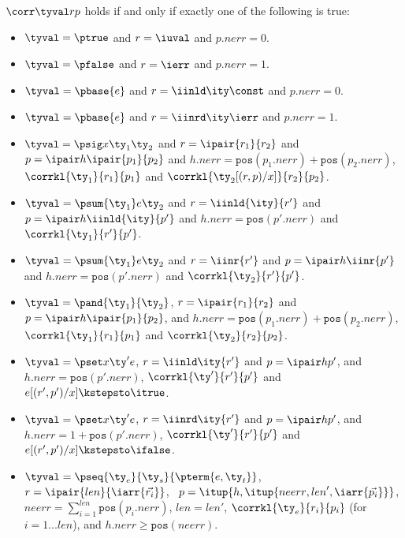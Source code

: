 \begin{definition}
$\corr \tyval r p$ holds if and only if exactly one of the following is true:
  \begin{itemize}
  \item $\tyval = \ptrue$ and $r = \iuval$ and $p.{nerr} = 0$.
  \item $\tyval = \pfalse$ and $r = \ierr$ and $p.{nerr} = 1$.
  \item $\tyval = \pbase{e}$ and $r = \iinld \ity \const$ and $p.{nerr} = 0$.
  \item $\tyval = \pbase{e}$ and $r = \iinrd \ity \ierr$ and $p.{nerr} = 1$.
  \item $\tyval = \psig x {\ty_1} {\ty_2}$ and $r =\ipair {r_1} {r_2}$ and $p =
    \ipair h {\ipair {p_1} {p_2}}$ 
    and $h.{nerr} = \mathtt{pos}(p_1.{nerr}) + \mathtt{pos}(p_2.{nerr})$, $\corrkl
    {\ty_1} {r_1} {p_1}$ and $\corrkl {\ty_2[(r,p)/x]} {r_2} {p_2}$.
  \item $\tyval = \psum {\ty_1} e {\ty_2}$ and $r =\iinld {\ity}{r'}$
    and $p = \ipair h {\iinld {\ity}{p'}}$
    and $h.{nerr} = \mathtt{pos}(p'.{nerr})$ and $\corrkl
    {\ty_1} {r'} {p'}$.
  \item $\tyval = \psum {\ty_1} e {\ty_2}$ and $r =\iinr {r'}$
    and $p = \ipair h {\iinr {p'}}$
    and $h.{nerr} = \mathtt{pos}(p'.{nerr})$ and $\corrkl
    {\ty_2} {r'} {p'}$.
  \item $\tyval = \pand {\ty_1} {\ty_2}$, $r = \ipair {r_1} {r_2}$ and $p =
    \ipair h {\ipair {p_1}{p_2}}$, 
    and $h.{nerr} = \mathtt{pos}(p_1.{nerr}) + \mathtt{pos}(p_2.{nerr})$, 
    $\corrkl {\ty_1} {r_1} {p_1}$ and $\corrkl {\ty_2} {r_2} {p_2}$.
  \item $\tyval = \pset x {\ty'} e$, $r = \iinld \ity {r'}$ and $p =
    \ipair h {p'}$, 
    and $h.{nerr} = \mathtt{pos}(p'.{nerr})$, $\corrkl {\ty'}{r'}{p'}$
    and $e[(r',p')/x] \kstepsto\itrue$.
  \item $\tyval = \pset x {\ty'} e$, $r = \iinrd \ity {r'}$
    and $p = \ipair h {p'}$,
    and $h.{nerr} = 1 + \mathtt{pos}(p'.{nerr})$,
    $\corrkl {\ty'}{r'}{p'}$ and $e[(r',p')/x] \kstepsto \ifalse$.
  \item $\tyval = \pseq {\ty_e}{\ty_s}{\pterm {e,\ty_t}}$, \
    $r = \ipair {len} {\iarr{\vec {r_i}}}$, \
    $p = \itup{h,\itup{{neerr},{len}',\iarr {\vec {p_i}}}}$,\\
    ${neerr} = \sum_{i=1}^{len} \mathtt{pos}(p_i.{nerr})$, 
    ${len} = {len}'$, $\corrkl {\ty_e}
    {r_i} {p_i}$ (for $i=1 \ldots {len}$), and
    $h.{nerr} \geq \mathtt{pos}({neerr})$.

\end{itemize}
\end{definition}
